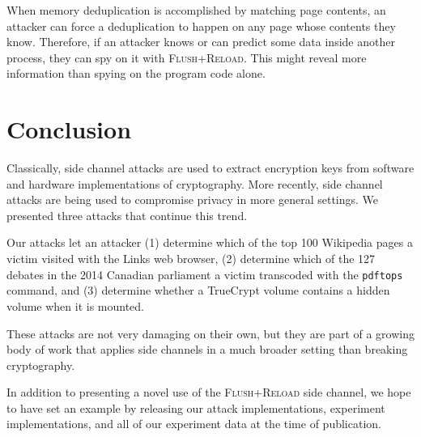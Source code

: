 \documentclass[letterpaper,twocolumn,10pt]{article}
\begin{document}
When memory deduplication is accomplished by matching page contents, an attacker
can force a deduplication to happen on any page whose contents they know.
Therefore, if an attacker knows or can predict some data inside another process,
they can spy on it with \textsc{Flush+Reload}. This might reveal more
information than spying on the program code alone.

\section{Conclusion}
\label{sec:conclusion}

Classically, side channel attacks are used to extract encryption keys from
software and hardware implementations of cryptography. More recently, side
channel attacks are being used to compromise privacy in more general settings.
We presented three attacks that continue this trend. 

Our attacks let an attacker (1) determine which of the top 100 Wikipedia pages
a victim visited with the Links web browser, (2) determine which of the 127
debates in the 2014 Canadian parliament a victim transcoded with the
\texttt{pdftops} command, and (3) determine whether a TrueCrypt volume contains
a hidden volume when it is mounted.

These attacks are not very damaging on their own, but they are part of a growing
body of work that applies side channels in a much broader setting than breaking
cryptography. 

In addition to presenting a novel use of the \textsc{Flush+Reload} side channel,
we hope to have set an example by releasing our attack implementations,
experiment implementations, and all of our experiment data at the time of
publication.

{\footnotesize 
}

\theendnotes
\end{document}

